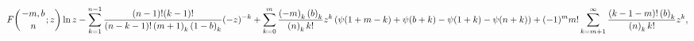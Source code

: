 \[\mathop{F\/}\nolimits\!\left({-m,b\atop n};z\right)\mathop{\ln\/}\nolimits z-%
\sum_{k=1}^{n-1}\frac{(n-1)!(k-1)!}{(n-k-1)!\left(m+1\right)_{k}\left(1-b%
\right)_{k}}(-z)^{-k}+\sum_{k=0}^{m}\frac{\left(-m\right)_{k}\left(b\right)_{k%
}}{\left(n\right)_{k}k!}z^{k}\left(\mathop{\psi\/}\nolimits\!\left(1+m-k\right%
)+\mathop{\psi\/}\nolimits\!\left(b+k\right)-\mathop{\psi\/}\nolimits\!\left(1%
+k\right)-\mathop{\psi\/}\nolimits\!\left(n+k\right)\right)+(-1)^{m}m!\sum_{k=%
m+1}^{\infty}\frac{(k-1-m)!\left(b\right)_{k}}{\left(n\right)_{k}k!}z^{k},\]